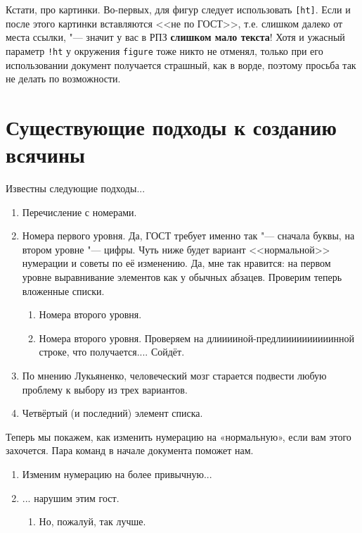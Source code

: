 

Кстати, про картинки. Во-первых, для фигур следует использовать \texttt{[ht]}. Если и после этого картинки вставляются <<не по ГОСТ>>, т.е. слишком далеко от места ссылки, "--- значит у вас в РПЗ \textbf{слишком мало текста}! Хотя и ужасный параметр \texttt{!ht} у окружения \texttt{figure} тоже никто не отменял, только при его использовании документ получается страшный, как в ворде, поэтому просьба так не делать по возможности.

\section{Существующие подходы к созданию всячины}

Известны следующие подходы...

\begin{enumerate}
\item Перечисление с номерами.
\item Номера первого уровня. Да, ГОСТ требует именно так "--- сначала буквы, на втором уровне "--- цифры.
Чуть ниже будет вариант <<нормальной>> нумерации и советы по её изменению.
Да, мне так нравится: на первом уровне выравнивание элементов как у обычных абзацев. Проверим теперь вложенные списки.
\begin{enumerate}
\item Номера второго уровня.
\item Номера второго уровня. Проверяем на длииииной-предлиииииииииинной строке, что получается.... Сойдёт.
\end{enumerate}
\item По мнению Лукьяненко, человеческий мозг старается подвести любую проблему к выбору
  из трех вариантов.
\item Четвёртый (и последний) элемент списка.
\end{enumerate}

Теперь мы покажем, как изменить нумерацию на «нормальную», если вам этого захочется. Пара команд в начале документа поможет нам.

\renewcommand{\labelenumi}{\arabic{enumi})}
\renewcommand{\labelenumii}{\asbuk{enumii})}

\begin{enumerate}
\item Изменим нумерацию на более привычную...
\item ... нарушим этим гост.
\begin{enumerate}
\item Но, пожалуй, так лучше.
\end{enumerate}
\end{enumerate}

